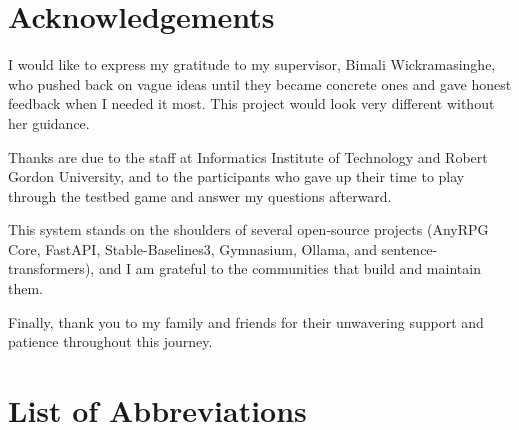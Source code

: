 \clearpage

\chapter*{Acknowledgements}

I would like to express my gratitude to my supervisor, Bimali Wickramasinghe, who pushed back on vague ideas until they became concrete ones and gave honest feedback when I needed it most. This project would look very different without her guidance.

Thanks are due to the staff at Informatics Institute of Technology and Robert Gordon University, and to the participants who gave up their time to play through the testbed game and answer my questions afterward.

This system stands on the shoulders of several open-source projects (AnyRPG Core, FastAPI, Stable-Baselines3, Gymnasium, Ollama, and sentence-transformers), and I am grateful to the communities that build and maintain them.

Finally, thank you to my family and friends for their unwavering support and patience throughout this journey. 

\clearpage

\tableofcontents
\newpage
\listoffigures
\newpage
\listoftables
\newpage

\chapter*{List of Abbreviations}

